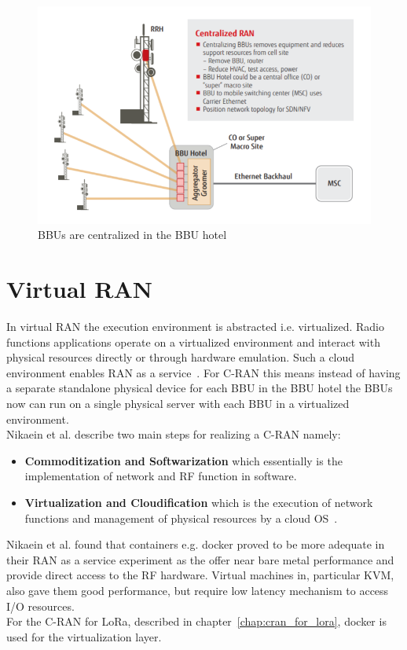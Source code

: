 \begin{figure}[h]
    \centering
    \includegraphics[width=1\textwidth]{figures/CRAN.png}
    \caption{BBUs are centralized in the BBU hotel~\cite{fujitsu}}
    \label{fig:CRAN}
\end{figure}

\section{Virtual RAN}
In virtual RAN the execution environment is abstracted i.e. virtualized.
Radio functions applications operate on a virtualized environment and interact
with physical resources directly or through hardware emulation.
Such a cloud environment enables RAN as a service~\cite{Nikaein2015}.
For C-RAN this means instead of having a separate standalone physical device
for each BBU in the BBU hotel the BBUs now can run on a single physical server with each
BBU in a virtualized environment. \\
Nikaein et al. describe two main steps for realizing a C-RAN namely:
\begin{itemize}
    \item \textbf{Commoditization and Softwarization} which essentially is the implementation of network and RF function in software.
    \item \textbf{Virtualization and Cloudification} which is the execution of network functions and management of physical resources by a cloud OS~\cite{Nikaein2015}.
\end{itemize}

Nikaein et al. found that containers e.g. docker proved to be more adequate in their RAN as a service experiment as the offer near bare metal performance
and provide direct access to the RF hardware. Virtual machines in, particular KVM, also gave them good performance, but require low latency mechanism to access I/O resources.
\\
For the C-RAN for LoRa, described in chapter~\ref{chap:cran_for_lora}, docker is used for the virtualization layer.
